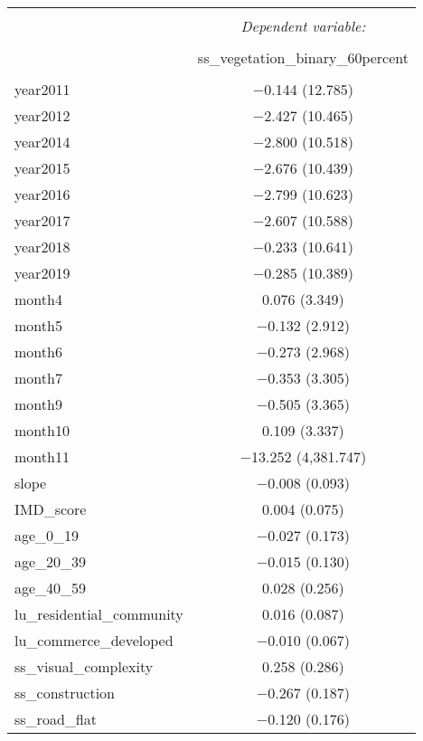 \begin{table}[!htbp] \centering 
  \caption{} 
  \label{} 
\small 
\begin{tabular}{@{\extracolsep{1pt}}lc} 
\\[-1.8ex]\hline 
\hline \\[-1.8ex] 
 & \multicolumn{1}{c}{\textit{Dependent variable:}} \\ 
\cline{2-2} 
\\[-1.8ex] & ss\_vegetation\_binary\_60percent \\ 
\hline \\[-1.8ex] 
 year2011 & $-$0.144 (12.785) \\ 
  year2012 & $-$2.427 (10.465) \\ 
  year2014 & $-$2.800 (10.518) \\ 
  year2015 & $-$2.676 (10.439) \\ 
  year2016 & $-$2.799 (10.623) \\ 
  year2017 & $-$2.607 (10.588) \\ 
  year2018 & $-$0.233 (10.641) \\ 
  year2019 & $-$0.285 (10.389) \\ 
  month4 & 0.076 (3.349) \\ 
  month5 & $-$0.132 (2.912) \\ 
  month6 & $-$0.273 (2.968) \\ 
  month7 & $-$0.353 (3.305) \\ 
  month9 & $-$0.505 (3.365) \\ 
  month10 & 0.109 (3.337) \\ 
  month11 & $-$13.252 (4,381.747) \\ 
  slope & $-$0.008 (0.093) \\ 
  IMD\_score & 0.004 (0.075) \\ 
  age\_0\_19 & $-$0.027 (0.173) \\ 
  age\_20\_39 & $-$0.015 (0.130) \\ 
  age\_40\_59 & 0.028 (0.256) \\ 
  lu\_residential\_community & 0.016 (0.087) \\ 
  lu\_commerce\_developed & $-$0.010 (0.067) \\ 
  ss\_visual\_complexity & 0.258 (0.286) \\ 
  ss\_construction & $-$0.267 (0.187) \\ 
  ss\_road\_flat & $-$0.120 (0.176) \\ 

\end{tabular}
\end{table}

